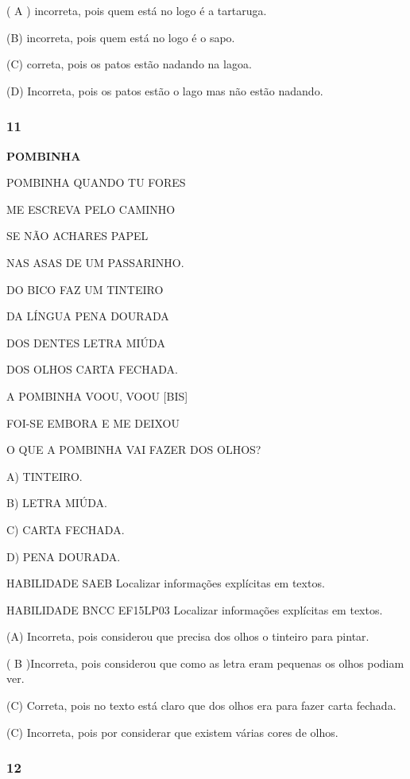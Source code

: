 \begin{escola}
( A ) incorreta, pois quem está no logo é a tartaruga.

(B) incorreta, pois quem está no logo é o sapo.

(C) correta, pois os patos estão nadando na lagoa.

(D) Incorreta, pois os patos estão o lago mas não estão nadando.

\subsubsection{11 }\label{section-83}

\textbf{POMBINHA}

POMBINHA QUANDO TU FORES

ME ESCREVA PELO CAMINHO

SE NÃO ACHARES PAPEL

NAS ASAS DE UM PASSARINHO.

DO BICO FAZ UM TINTEIRO

DA LÍNGUA PENA DOURADA

DOS DENTES LETRA MIÚDA

DOS OLHOS CARTA FECHADA.

A POMBINHA VOOU, VOOU {[}BIS{]}

FOI-SE EMBORA E ME DEIXOU

O QUE A POMBINHA VAI FAZER DOS OLHOS?

A) TINTEIRO.

B) LETRA MIÚDA.

C) CARTA FECHADA.

D) PENA DOURADA.

HABILIDADE SAEB Localizar informações explícitas em textos.

HABILIDADE BNCC EF15LP03 Localizar informações explícitas em textos.

(A) Incorreta, pois considerou que precisa dos olhos o tinteiro para
pintar.

( B )Incorreta, pois considerou que como as letra eram pequenas os olhos
podiam ver.

(C) Correta, pois no texto está claro que dos olhos era para fazer carta
fechada.

(C) Incorreta, pois por considerar que existem várias cores de
olhos.\protect\hypertarget{_heading=h.xyn2rjyn0l4h}{}{}

\subsubsection{12}\label{section-84}


\end{escola}

